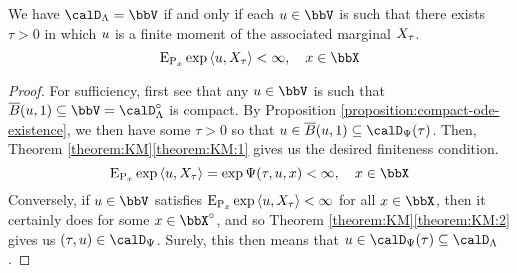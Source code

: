 \begin{proposition}
  We have $\odeSpace = \vecSpace$ if and only if each $\momentVar \in \vecSpace$ is such that there exists $\tau > 0$ in which $u$ is a finite moment of the associated marginal $X_\tau$.
  \begin{equation*}
    \Exp_{\Prb_\stateVar}\exp\prj{\momentVar}{\X_\tau} < \infty, \quad \stateVar \in \stateSpace
  \end{equation*}
\end{proposition}
\begin{proof}
  For sufficiency, first see that any $\momentVar \in \vecSpace$ is such that $\closedBall{\momentVar}{1} \subseteq \vecSpace = \odeSpace^\circ$ is compact.
  By Proposition \ref{proposition:compact-ode-existence}, we then have some $\tau > 0$ so that $\momentVar \in \closedBall{\momentVar}{1} \subseteq \momentSpace(\tau)$.
  Then, Theorem \ref{theorem:KM}\ref{theorem:KM:1} gives us the desired finiteness condition.
  \begin{equation*}
    \Exp_{\Prb_\stateVar}\exp\prj{\momentVar}{\X_\tau} = \exp\aff(\tau, \momentVar, \stateVar) < \infty, \quad \stateVar \in \stateSpace
  \end{equation*}
  Conversely, if $\momentVar \in \vecSpace$ satisfies ${\operatorname{E}}_{{\operatorname{P}}_x}\exp{\langle u, X_\tau \rangle} < \infty$ for all $\stateVar \in \stateSpace$, then it certainly does for some $\stateVar \in \stateSpace^\circ$, and so Theorem \ref{theorem:KM}\ref{theorem:KM:2} gives us $(\tau, \momentVar) \in \momentSpace$.
  Surely, this then means that $\momentVar \in \momentSpace(\tau) \subseteq \odeSpace$.
\end{proof}
